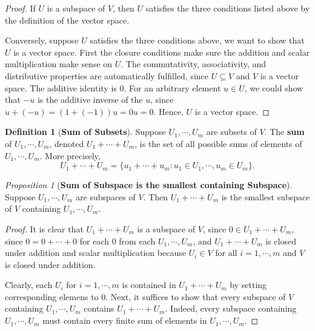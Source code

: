 \documentclass[paper=a4, fontsize=11pt]{scrartcl}
\numberwithin{equation}{section}		%
\numberwithin{figure}{section}			%
\numberwithin{table}{section}				%
\theoremstyle{definition}
\newtheorem{definition}{Definition}[section]
\theoremstyle{remark}
\theoremstyle{example}
\newtheorem{prop}{Proposition}[section]
\begin{document}
\begin{proof}
    If $U$ is a subspace of $V$, then $U$ satisfies the three conditions listed above by the definition of the vector space.
    
    Conversely, suppose $U$ satisfies the three conditions above, we want to show that $U$ is a vector space. First the closure conditions make sure the addition and scalar multiplication make sense on $U$. The commutativity, associativity, and distributive properties are automatically fulfilled, since $U \subseteq V$ and $V$ is a vector space. The additive identity is $0$. For an arbitrary element $u \in U$, we could show that $-u$ is the additive inverse of the $u$, since $u + (-u) = (1+(-1))u = 0u = 0$. Hence, $U$ is a vector space.
    \end{proof}

\begin{definition}[\textbf{Sum of Subsets}]
    Suppose $U_1,\cdots,U_m$ are subsets of $V$. The \textbf{sum} of $U_1,\cdots,U_m$, denoted $U_1+\cdots+U_m$, is the set of all possible sums of elements of $U_1,\cdots,U_m$. More precisely,
    \begin{equation}
        U_1+\cdots+U_m = \{u_1+\cdots+u_m:u_1\in U_1,\cdots, u_m\in U_m\}.
    \end{equation}
\end{definition}

\begin{prop}[\textbf{Sum of Subspace is the smallest containing Subspace}]
    Suppose $U_1,\cdots,U_m$ are subspaces of $V$. Then $U_1+\cdots+U_m$ is the smallest subspace of $V$ containing $U_1,\cdots,U_m$.
\end{prop}

\begin{proof}
    It is clear that $U_1+\cdots+U_m$ is a subspace of $V$, since $0 \in U_1+\cdots+U_m$, since $0 = 0 + \cdots + 0$ for each $0$ from each $U_1, \cdots, U_m$, and $U_1+\cdots+U_m$ is closed under addition and scalar multiplication because $U_i \in V$ for all $i = 1,\cdots,m$ and $V$ is closed under addition.
    
    Clearly, each $U_i$ for $i = 1,\cdots,m$ is contained in $U_1+\cdots+U_m$ by setting corresponding elemens to $0$. Next, it suffices to show that every subspace of $V$ containing $U_1,\cdots,U_m$ contains $U_1+\cdots+U_m$. Indeed, every subspace containing $U_1,\cdots,U_m$ must contain every finite sum of elements in $U_1,\cdots,U_m$.
\end{proof}
\end{document}
